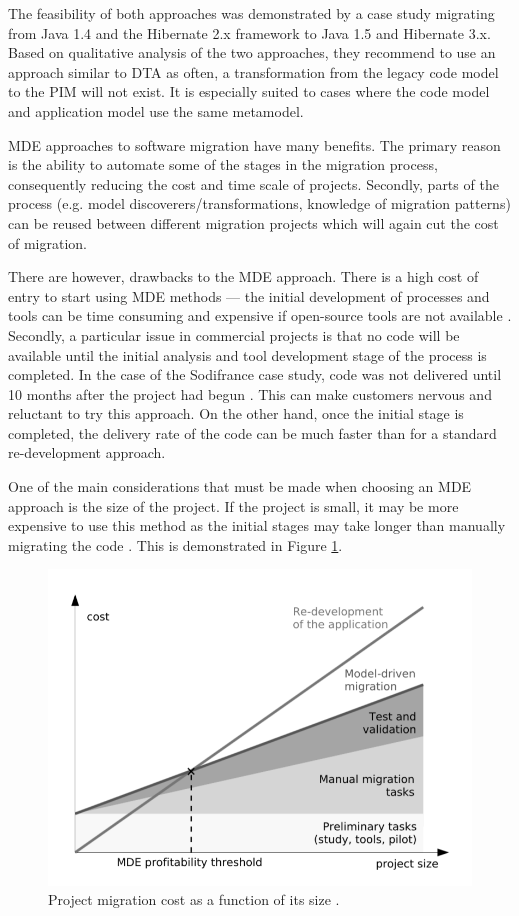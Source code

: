\documentclass{UoYCSproject}
\begin{document}
\pagebreak
The feasibility of both approaches was demonstrated by a case study migrating from Java 1.4 and the Hibernate 2.x framework to Java 1.5 and Hibernate 3.x. Based on qualitative analysis of the two approaches, they recommend to use an approach similar to DTA as often, a transformation from the legacy code model to the PIM will not exist. It is especially suited to cases where the code model and application model use the same metamodel. 

MDE approaches to software migration have many benefits. The primary reason is the ability to automate some of the stages in the migration process, consequently reducing the cost and time scale of projects. Secondly, parts of the process (e.g. model discoverers/transformations, knowledge of migration patterns) can be reused between different migration projects which will again cut the cost of migration.

There are however, drawbacks to the MDE approach. There is a high cost of entry to start using MDE methods --- the initial development of processes and tools can be time consuming and expensive if open-source tools are not available \parencite{fleurey2007model}. Secondly, a particular issue in commercial projects is that no code will be available until the initial analysis and tool development stage of the process is completed. In the case of the Sodifrance case study, code was not delivered until 10 months after the project had begun \parencite{fleurey2007model}. This can make customers nervous and reluctant to try this approach. On the other hand, once the initial stage is completed, the delivery rate of the code can be much faster than for a standard re-development approach.

One of the main considerations that must be made when choosing an MDE approach is the size of the project. If the project is small, it may be more expensive to use this method as the initial stages may take longer than manually migrating the code \parencite{fleurey2007model}. This is demonstrated in Figure \ref{fig:costvsize}.

\begin{figure}[h!]
  \centering
  \includegraphics[width=0.6\linewidth]{graphics/costvsize.png}
  \caption{Project migration cost as a function of its size \parencite{fleurey2007model}.}
  \label{fig:costvsize}
\end{figure}
\end{document}
